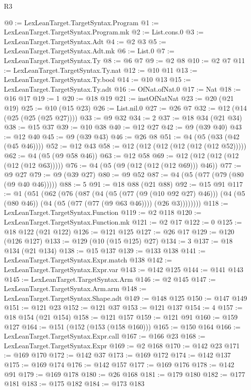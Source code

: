 \begin{lexlean}{R3}
\begin{coremodule}
@0 := LexLeanTarget.TargetSyntax.Program
@1 := LexLeanTarget.TargetSyntax.Program.mk
@2 := List.cons.{0}
@3 := LexLeanTarget.TargetSyntax.Adt
@4 := @2 @3
@5 := LexLeanTarget.TargetSyntax.Adt.mk
@6 := List.{0}
@7 := LexLeanTarget.TargetSyntax.Ty
@8 := @6 @7
@9 := @2 @8
@10 := @2 @7
@11 := LexLeanTarget.TargetSyntax.Ty.nat
@12 := @10 @11
@13 := LexLeanTarget.TargetSyntax.Ty.bool
@14 := @10 @13
@15 := LexLeanTarget.TargetSyntax.Ty.adt
@16 := OfNat.ofNat.{0}
@17 := Nat
@18 := @16 @17
@19 := 1
@20 := @18 @19
@21 := instOfNatNat
@23 := @20 (@21 @19)
@25 := @10 (@15 @23)
@26 := List.nil.{0}
@27 := @26 @7
@32 := @12 (@14 (@25 (@25 (@25 @27))))
@33 := @9 @32
@34 := 2
@37 := @18 @34 (@21 @34)
@38 := @15 @37
@39 := @10 @38
@40 := @12 @27
@42 := @9 (@39 @40)
@43 := @12 @40
@45 := @9 (@39 @43)
@46 := @26 @8
@51 := @4 (@5 (@33 (@42 (@45 @46))))
@52 := @12 @43
@58 := @12 (@12 (@12 (@12 (@12 (@12 @52)))))
@62 := @4 (@5 (@9 @58 @46))
@63 := @12 @58
@69 := @12 (@12 (@12 (@12 (@12 (@12 @63)))))
@76 := @4 (@5 (@9 (@12 (@12 (@12 @69))) @46))
@77 := @9 @27
@79 := @9 (@39 @27)
@80 := @9 @52
@87 := @4 (@5 (@77 (@79 (@80 (@9 @40 @46)))))
@88 := 5
@91 := @18 @88 (@21 @88)
@92 := @15 @91
@117 := @1
    (@51
      (@62
        (@76
          (@87
            (@4
              (@5 (@77 (@9 (@10 @92 @27) @46)))
              (@4 (@5 (@80 @46)) (@4 (@5 (@77 (@77 (@9 @63 @46)))) (@26 @3))))))))
@118 := LexLeanTarget.TargetSyntax.Function
@119 := @2 @118
@120 := LexLeanTarget.TargetSyntax.Function.mk
@121 := @2 @17
@122 := 0
@125 := @18 @122 (@21 @122)
@126 := @121 @125
@127 := @26 @17
@129 := @120 (@126 @127)
@133 := @129 (@10 (@15 @125) @27)
@134 := 3
@137 := @18 @134 (@21 @134)
@138 := @15 @137
@139 := @133 @138
@141 := LexLeanTarget.TargetSyntax.Expr.match @138
@142 := LexLeanTarget.TargetSyntax.Expr.var
@143 := @142 @125
@144 := @141 @143
@145 := LexLeanTarget.TargetSyntax.Arm
@146 := @2 @145
@147 := LexLeanTarget.TargetSyntax.Arm.arm
@148 := LexLeanTarget.TargetSyntax.Shape.adt
@149 := @148 @125
@150 := @147 @149
@151 := @121 @23
@152 := @121 @37
@153 := @121 @137
@154 := 4
@157 := @18 @154 (@21 @154)
@158 := @121 @157
@159 := @121 @91
@160 := @159 @127
@164 := @151 (@152 (@153 (@158 @160)))
@165 := @150 @164
@166 := LexLeanTarget.TargetSyntax.Expr.call
@167 := @166 @23
@168 := LexLeanTarget.TargetSyntax.Expr
@169 := @2 @168
@170 := @142 @23
@171 := @169 @170
@172 := @142 @37
@173 := @169 @172
@174 := @142 @137
@175 := @169 @174
@176 := @142 @157
@177 := @169 @176
@178 := @142 @91
@179 := @169 @178
@180 := @26 @168
@181 := @179 @180
@182 := @177 @181
@183 := @175 @182
@184 := @173 @183

\end{coremodule}
\end{lexlean}

